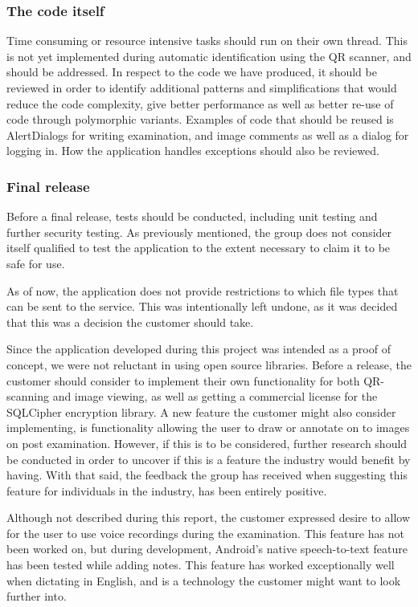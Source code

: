 \subsubsection{The code itself}
Time consuming or resource intensive tasks should run on their own thread. This is not yet implemented during automatic identification using the QR scanner, and should be addressed. In respect to the code we have produced, it should be reviewed in order to identify additional patterns and simplifications that would reduce the code complexity, give better performance as well as better re-use of code through polymorphic variants. Examples of code that should be reused is AlertDialogs for writing examination, and image comments as well as a dialog for logging in. How the application handles exceptions should also be reviewed. 

\subsubsection{Final release}
Before a final release, tests should be conducted, including unit testing and further security testing. As previously mentioned, the group does not consider itself qualified to test the application to the extent necessary to claim it to be safe for use.  

As of now, the application does not provide restrictions to which file types that can be sent to the service. This was intentionally left undone, as it was decided that this was a decision the customer should take. 

Since the application developed during this project was intended as a proof of concept, we were not reluctant in using open source libraries. Before a release, the customer should consider to implement their own functionality for both QR-scanning and image viewing, as well as getting a commercial license for the SQLCipher encryption library. 
A new feature the customer might also consider implementing, is functionality allowing the user to draw or annotate on to images on post examination. However, if this is to be considered, further research should be conducted in order to uncover if this is a feature the industry would benefit by having. With that said, the feedback the group has received when suggesting this feature for individuals in the industry, has been entirely positive.

Although not described during this report, the customer expressed desire to allow for the user to use voice recordings during the examination. This feature has not been worked on, but during development, Android's native speech-to-text feature has been tested while adding notes. This feature has worked exceptionally well when dictating in English, and is a technology the customer might want to look further into. 